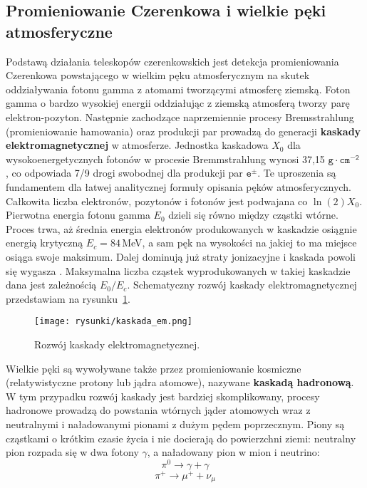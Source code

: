 \documentclass[a4paper,11pt,twoside]{article}
\begin{document}
\subsection{Promieniowanie Czerenkowa i wielkie pęki atmosferyczne}
Podstawą działania teleskopów czerenkowskich jest detekcja promieniowania Czerenkowa powstającego w wielkim pęku atmosferycznym na skutek oddziaływania fotonu gamma z atomami tworzącymi atmosferę ziemską. 
Foton gamma o bardzo wysokiej energii oddziałując z ziemską atmosferą tworzy parę elektron-pozyton. Następnie zachodzące naprzemiennie procesy Bremsstrahlung (promieniowanie hamowania) oraz produkcji par prowadzą do generacji {\bf{kaskady elektromagnetycznej}} w atmosferze. Jednostka kaskadowa $X_0$ dla wysokoenergetycznych fotonów w procesie Bremmstrahlung wynosi 37,15 $\mathtt{g} \cdot \mathtt{cm^{-2}}$ \cite{IACT}, co odpowiada 7/9 drogi swobodnej dla produkcji par $\mathtt{e^{\pm}}$. Te uproszenia są fundamentem dla łatwej analitycznej formuły opisania pęków atmosferycznych. Całkowita liczba elektronów, pozytonów i fotonów jest podwajana co $\ln(2) X_0$. Pierwotna energia fotonu gamma $E_0$ dzieli się równo między cząstki wtórne. Proces trwa, aż średnia energia elektronów produkowanych w kaskadzie osiągnie energią krytyczną $E_c = 84$\,MeV, a sam pęk na wysokości na jakiej to ma miejsce osiąga swoje maksimum. Dalej   dominują już straty jonizacyjne i kaskada powoli się wygasza \cite{IACT}. Maksymalna liczba cząstek wyprodukowanych w takiej kaskadzie dana jest zależnością $E_0 / E_c$. Schematyczny rozwój kaskady elektromagnetycznej przedstawiam na rysunku~\ref{fig:cas_em}. 
\begin{figure}[H] 
\centering
\texttt{[image: rysunki/kaskada\_em.png]}
\caption{Rozwój kaskady elektromagnetycznej.}
\label{fig:cas_em}
\end{figure}
Wielkie pęki są wywoływane także przez promieniowanie kosmiczne (relatywistyczne protony lub jądra atomowe), nazywane {\bf{kaskadą hadronową}}. W tym przypadku rozwój kaskady jest bardziej skomplikowany, procesy hadronowe prowadzą do powstania wtórnych jąder atomowych wraz z neutralnymi i naładowanymi pionami z dużym pędem poprzecznym. Piony są cząstkami o krótkim czasie życia i nie docierają do powierzchni ziemi: neutralny pion rozpada się w dwa fotony $\gamma$, a naładowany pion w mion i neutrino:
\begin{equation*}
\pi^0 \rightarrow \gamma + \gamma 
\end{equation*}
\begin{equation*}
\pi^+ \rightarrow \mu^+ + \nu_{\mu}
\end{equation*}  
\end{document}
